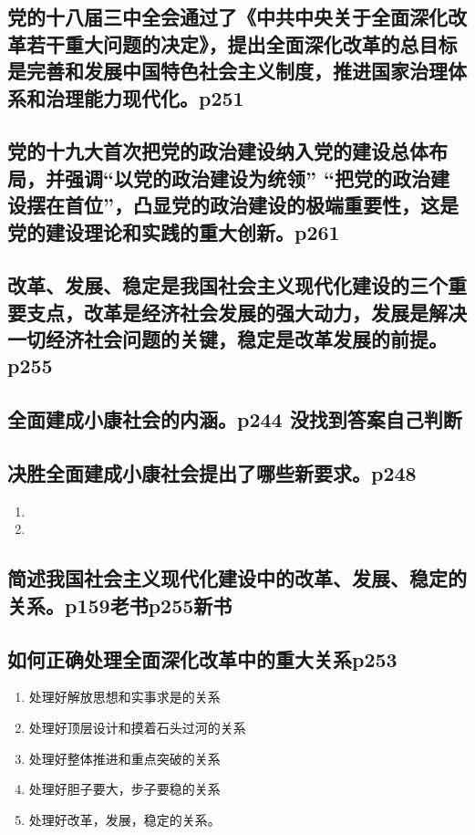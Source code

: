 \documentclass[UTF8]{ctexart}
\begin{document}
\subsection{党的十八届三中全会通过了《中共中央关于全面深化改革若干重大问题的决定》，提出全面深化改革的总目标是完善和发展中国特色社会主义制度，推进国家治理体系和治理能力现代化。p251}
\subsection{党的十九大首次把党的政治建设纳入党的建设总体布局，并强调“以党的政治建设为统领” “把党的政治建设摆在首位”，凸显党的政治建设的极端重要性，这是党的建设理论和实践的重大创新。p261}
\subsection{改革、发展、稳定是我国社会主义现代化建设的三个重要支点，改革是经济社会发展的强大动力，发展是解决一切经济社会问题的关键，稳定是改革发展的前提。p255}
\subsection{全面建成小康社会的内涵。p244 没找到答案自己判断}
\subsection{决胜全面建成小康社会提出了哪些新要求。p248}
\begin{enumerate}[(1)]
    \item 
    \item 
\end{enumerate}
\subsection{简述我国社会主义现代化建设中的改革、发展、稳定的关系。p159老书p255新书}
\newpage
\subsection{如何正确处理全面深化改革中的重大关系p253}
\begin{enumerate}[(1)]
    \item 处理好解放思想和实事求是的关系
    \item 处理好顶层设计和摸着石头过河的关系
    \item 处理好整体推进和重点突破的关系
    \item 处理好胆子要大，步子要稳的关系
    \item 处理好改革，发展，稳定的关系。 
\end{enumerate}
\end{document}
